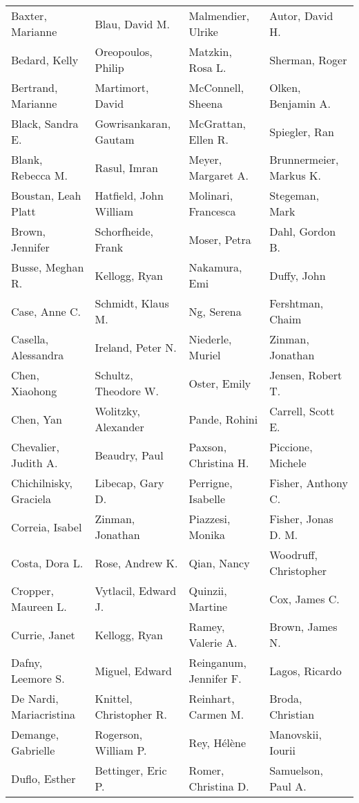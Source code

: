 \begin{ThreePartTable}
{\begin{longtable}[c]{llll}
            Baxter, Marianne&Blau, David M.&Malmendier, Ulrike&Autor, David H.\\
            Bedard, Kelly&Oreopoulos, Philip&Matzkin, Rosa L.&Sherman, Roger\\
            Bertrand, Marianne&Martimort, David&McConnell, Sheena&Olken, Benjamin A.\\
            Black, Sandra E.&Gowrisankaran, Gautam&McGrattan, Ellen R.&Spiegler, Ran\\
            Blank, Rebecca M.&Rasul, Imran&Meyer, Margaret A.&Brunnermeier, Markus K.\\
            Boustan, Leah Platt&Hatfield, John William&Molinari, Francesca&Stegeman, Mark\\
            Brown, Jennifer&Schorfheide, Frank&Moser, Petra&Dahl, Gordon B.\\
            Busse, Meghan R.&Kellogg, Ryan&Nakamura, Emi&Duffy, John\\
            Case, Anne C.&Schmidt, Klaus M.&Ng, Serena&Fershtman, Chaim\\
            Casella, Alessandra&Ireland, Peter N.&Niederle, Muriel&Zinman, Jonathan\\
            Chen, Xiaohong&Schultz, Theodore W.&Oster, Emily&Jensen, Robert T.\\
            Chen, Yan&Wolitzky, Alexander&Pande, Rohini&Carrell, Scott E.\\
            Chevalier, Judith A.&Beaudry, Paul&Paxson, Christina H.&Piccione, Michele\\
            Chichilnisky, Graciela&Libecap, Gary D.&Perrigne, Isabelle&Fisher, Anthony C.\\
            Correia, Isabel&Zinman, Jonathan&Piazzesi, Monika&Fisher, Jonas D. M.\\
            Costa, Dora L.&Rose, Andrew K.&Qian, Nancy&Woodruff, Christopher\\
            Cropper, Maureen L.&Vytlacil, Edward J.&Quinzii, Martine&Cox, James C.\\
            Currie, Janet&Kellogg, Ryan&Ramey, Valerie A.&Brown, James N.\\
            Dafny, Leemore S.&Miguel, Edward&Reinganum, Jennifer F.&Lagos, Ricardo\\
            De Nardi, Mariacristina&Knittel, Christopher R.&Reinhart, Carmen M.&Broda, Christian\\
            Demange, Gabrielle&Rogerson, William P.&Rey, Hélène&Manovskii, Iourii\\
            Duflo, Esther&Bettinger, Eric P.&Romer, Christina D.&Samuelson, Paul A.\\

\end{longtable}}
\end{ThreePartTable}
